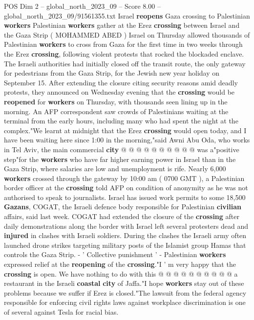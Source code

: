 \begin{textsample}{POS Dim 2 – global\_north\_2023\_09 – Score 8.00 – global\_north\_2023\_09/91561355.txt}  \label{ex:f2_pos_380}
Israel \textbf{reopens} Gaza crossing to Palestinian \textbf{workers} Palestinian \textbf{workers} gather at the Erez \textbf{crossing} between Israel and the Gaza Strip ( MOHAMMED ABED ) Israel on Thursday allowed thousands of Palestinian \textbf{workers} to cross from Gaza for the first time in two weeks through the Erez \textbf{crossing}, following violent protests that rocked the blockaded enclave.
The Israeli authorities had initially closed off the transit route, the only gateway for pedestrians from the Gaza Strip, for the Jewish new year holiday on September 15.
After extending the closure citing security reasons amid deadly protests, they announced on Wednesday evening that the \textbf{crossing} would be \textbf{reopened} for \textbf{workers} on Thursday, with thousands seen lining up in the morning.
An AFP correspondent saw crowds of Palestinians waiting at the terminal from the early hours, including many who had spent the night at the complex."We learnt at midnight that the Erez \textbf{crossing} would open today, and I have been waiting here since 1:00 in the morning,"said Awni Abu Oda, who works in Tel Aviv, the main commercial \textbf{city} @ @ @ @ @ @ @ @ @ @ was a"positive step"for the \textbf{workers} who have far higher earning power in Israel than in the Gaza Strip, where salaries are low and unemployment is rife.
Nearly 6,000 \textbf{workers} crossed through the gateway by 10:00 am ( 0700 GMT ), a Palestinian border officer at the \textbf{crossing} told AFP on condition of anonymity as he was not authorised to speak to journalists.
Israel has issued work permits to some 18,500 \textbf{Gazans}, COGAT, the Israeli defence body responsible for Palestinian \textbf{civilian} affairs, said last week.
COGAT had extended the closure of the \textbf{crossing} after daily demonstrations along the border with Israel left several protesters dead and \textbf{injured} in clashes with Israeli soldiers.
During the clashes the Israeli army often launched drone strikes targeting military posts of the Islamist group Hamas that controls the Gaza Strip. - ' Collective punishment ' - Palestinian \textbf{workers} expressed relief at the \textbf{reopening} of the \textbf{crossing}."I ' m very happy that the \textbf{crossing} is open.
We have nothing to do with this @ @ @ @ @ @ @ @ @ @ a restaurant in the Israeli \textbf{coastal} \textbf{city} of Jaffa."I hope \textbf{workers} stay out of these problems because we suffer if Erez is closed."The lawsuit from the federal agency responsible for enforcing civil rights laws against workplace discrimination is one of several against Tesla for racial bias.

\end{textsample}
